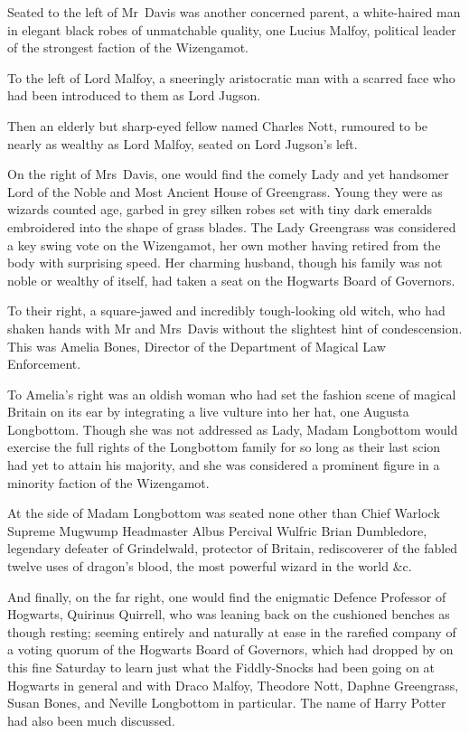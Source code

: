 Seated to the left of Mr~Davis was another concerned parent, a white-haired man in elegant black robes of unmatchable quality, one Lucius Malfoy, political leader of the strongest faction of the Wizengamot.

To the left of Lord Malfoy, a sneeringly aristocratic man with a scarred face who had been introduced to them as Lord Jugson.

Then an elderly but sharp-eyed fellow named Charles Nott, rumoured to be nearly as wealthy as Lord Malfoy, seated on Lord Jugson's left.

On the right of Mrs~Davis, one would find the comely Lady and yet handsomer Lord of the Noble and Most Ancient House of Greengrass. Young they were as wizards counted age, garbed in grey silken robes set with tiny dark emeralds embroidered into the shape of grass blades. The Lady Greengrass was considered a key swing vote on the Wizengamot, her own mother having retired from the body with surprising speed. Her charming husband, though his family was not noble or wealthy of itself, had taken a seat on the Hogwarts Board of Governors.

To their right, a square-jawed and incredibly tough-looking old witch, who had shaken hands with Mr and Mrs~Davis without the slightest hint of condescension. This was Amelia Bones, Director of the Department of Magical Law Enforcement.

To Amelia's right was an oldish woman who had set the fashion scene of magical Britain on its ear by integrating a live vulture into her hat, one Augusta Longbottom. Though she was not addressed as Lady, Madam Longbottom would exercise the full rights of the Longbottom family for so long as their last scion had yet to attain his majority, and she was considered a prominent figure in a minority faction of the Wizengamot.

At the side of Madam Longbottom was seated none other than Chief Warlock Supreme Mugwump Headmaster Albus Percival Wulfric Brian Dumbledore, legendary defeater of Grindelwald, protector of Britain, rediscoverer of the fabled twelve uses of dragon's blood, the most powerful wizard in the world \&c.

And finally, on the far right, one would find the enigmatic Defence Professor of Hogwarts, Quirinus Quirrell, who was leaning back on the cushioned benches as though resting; seeming entirely and naturally at ease in the rarefied company of a voting quorum of the Hogwarts Board of Governors, which had dropped by on this fine Saturday to learn just what the Fiddly-Snocks had been going on at Hogwarts in general and with Draco Malfoy, Theodore Nott, Daphne Greengrass, Susan Bones, and Neville Longbottom in particular. The name of Harry Potter had also been much discussed.

